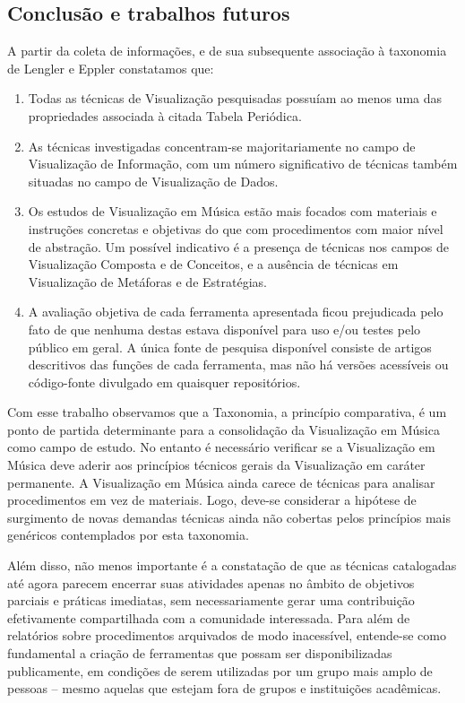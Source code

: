 \documentclass{sciposter}
\begin{document}
\begin{multicols}{3}

\section{Conclusão e trabalhos futuros}

A partir da coleta de informações, e de sua subsequente associação à taxonomia
de Lengler e Eppler constatamos que:

\begin{enumerate}
\item Todas as técnicas de Visualização pesquisadas possuíam ao menos uma das
propriedades associada à citada Tabela Periódica.
\item As técnicas investigadas concentram-se majoritariamente no campo de
Visualização de Informação, com um número significativo de técnicas também
situadas no campo de Visualização de Dados.
\item Os estudos de Visualização em Música estão mais focados com materiais e
instruções concretas e objetivas do que com procedimentos com maior nível de
abstração. Um possível indicativo é a presença de técnicas nos campos de
Visualização Composta e de Conceitos, e a ausência de técnicas em Visualização
de Metáforas e de Estratégias.
\item A avaliação objetiva de cada ferramenta apresentada ficou prejudicada pelo
fato de que nenhuma destas estava disponível para uso e/ou testes pelo público
em geral. A única fonte de pesquisa disponível consiste de artigos descritivos
das funções de cada ferramenta, mas não há versões acessíveis ou código-fonte
divulgado em quaisquer repositórios.
\end{enumerate}

Com esse trabalho observamos que a Taxonomia, a princípio comparativa, é um
ponto de partida determinante para a consolidação da Visualização em Música
como campo de estudo. No entanto é necessário verificar se a Visualização em
Música deve aderir aos princípios técnicos gerais da Visualização em caráter
permanente. A Visualização em Música ainda carece de técnicas para analisar
procedimentos em vez de materiais. Logo, deve-se considerar a hipótese de
surgimento de novas demandas técnicas ainda não cobertas pelos princípios mais
genéricos contemplados por esta taxonomia.

Além disso, não menos importante é a constatação de que as técnicas catalogadas
até agora parecem encerrar suas atividades apenas no âmbito de objetivos
parciais e práticas imediatas, sem necessariamente gerar uma contribuição
efetivamente compartilhada com a comunidade interessada. Para além de
relatórios sobre procedimentos arquivados de modo inacessível, entende-se como
fundamental a criação de ferramentas que possam ser disponibilizadas
publicamente, em condições de serem utilizadas por um grupo mais amplo de
pessoas -- mesmo aquelas que estejam fora de grupos e instituições acadêmicas.

\renewcommand{\refname}{Bibliografia}

\nocite{Lengler2007}



\end{multicols}
\end{document}

